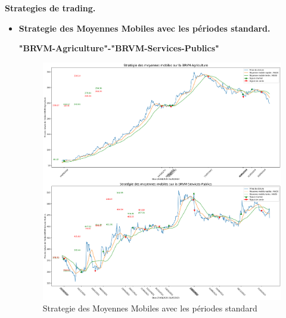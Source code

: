 \textbf{Strategies de trading.}
\begin{itemize}
\item[\ding{226}] \textbf{Strategie des Moyennes Mobiles avec les périodes standard.} \\
\begin{center}     \textbf{"BRVM-Agriculture"-"BRVM-Services-Publics"}  \end{center}

\begin{figure}[h]
    \centering
    \includegraphics[width=1 \textwidth ]{img/MA-standard.png}
    \caption{Strategie des Moyennes Mobiles avec les périodes standard}
    \label{fig:Strategie des Moyennes Mobiles avec les périodes standard}
\end{figure}


\newpage


\end{itemize}
